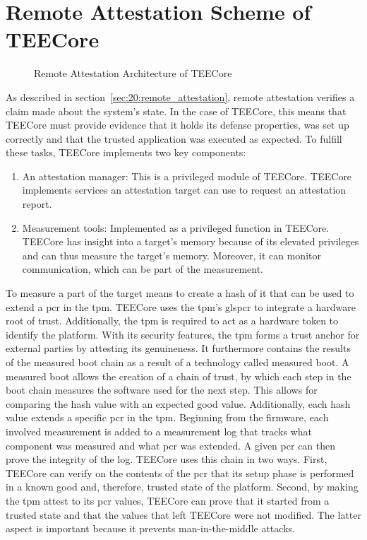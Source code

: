 \section{Remote Attestation Scheme of TEECore}
\label{sec:30:tee_ra_scheme}
\begin{figure}
    \begin{center}
        
        \caption{Remote Attestation Architecture of TEECore}
        \label{fig:30:tee_ra}
    \end{center}
\end{figure}
As described in section~\ref{sec:20:remote_attestation}, remote attestation
verifies a claim made about the system's state. In the case of TEECore, this
means that TEECore must provide evidence that it holds its defense properties,
was set up correctly and that the trusted application was executed as expected.
To fulfill these tasks, TEECore implements two key components:
\begin{enumerate}
    \item An attestation manager: This is a privileged module of
          TEECore. TEECore implements services an attestation target can use to
          request an attestation report.
    \item Measurement tools: Implemented as a privileged function in TEECore.
          TEECore has insight into a target's memory because of its elevated
          privileges and can thus measure the target's memory. Moreover, it can
          monitor communication, which can be part of the measurement.
\end{enumerate}

To measure a part of the target means to create a hash of it that can be used to
extend a \gls{pcr} in the \gls{tpm}. TEECore uses the \gls{tpm}'s gls{pcr} to
integrate a hardware root of trust. Additionally, the \gls{tpm} is required to
act as a hardware token to identify the platform. With its security features,
the \gls{tpm} forms a trust anchor for external parties by attesting its
genuineness. It furthermore contains the results of the measured boot chain as a
result of a technology called measured boot. A measured boot allows the creation
of a chain of trust, by which each step in the boot chain measures the software
used for the next step. This allows for comparing the hash value with an
expected good value. Additionally, each hash value extends a specific \gls{pcr}
in the \gls{tpm}. Beginning from the firmware, each involved measurement is
added to a measurement log that tracks what component was measured and what
\gls{pcr} was extended. A given \gls{pcr} can then prove the integrity of the
log. TEECore uses this chain in two ways. First, TEECore can verify on the
contents of the \gls{pcr} that its setup phase is performed in a known good and,
therefore, trusted state of the platform. Second, by making the \gls{tpm} attest
to its \gls{pcr} values, TEECore can prove that it started from a trusted state
and that the values that left TEECore were not modified. The latter aspect is
important because it prevents man-in-the-middle attacks. \\

